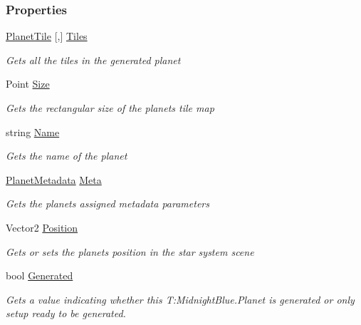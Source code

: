 \subsubsection*{Properties}
\begin{DoxyCompactItemize}
\item 
\hyperlink{class_midnight_blue_1_1_planet_tile}{Planet\+Tile} \mbox{[},\mbox{]} \hyperlink{class_midnight_blue_1_1_planet_a3e78bf28456cdfd2576b68e3ef106fc7}{Tiles}
\begin{DoxyCompactList}\small\item\em Gets all the tiles in the generated planet \end{DoxyCompactList}\item 
Point \hyperlink{class_midnight_blue_1_1_planet_a10c69ed4de9c28b2e61848e3bb89c377}{Size}
\begin{DoxyCompactList}\small\item\em Gets the rectangular size of the planets tile map \end{DoxyCompactList}\item 
string \hyperlink{class_midnight_blue_1_1_planet_aafbf18faf5aea56097d4f20d6b166d8a}{Name}
\begin{DoxyCompactList}\small\item\em Gets the name of the planet \end{DoxyCompactList}\item 
\hyperlink{class_midnight_blue_1_1_planet_metadata}{Planet\+Metadata} \hyperlink{class_midnight_blue_1_1_planet_a064b1e2b9aa83abac4065f4a7e0c5e58}{Meta}
\begin{DoxyCompactList}\small\item\em Gets the planets assigned metadata parameters \end{DoxyCompactList}\item 
Vector2 \hyperlink{class_midnight_blue_1_1_planet_a1ca1fc407e47136abb5b633e11cb8d51}{Position}
\begin{DoxyCompactList}\small\item\em Gets or sets the planets position in the star system scene \end{DoxyCompactList}\item 
bool \hyperlink{class_midnight_blue_1_1_planet_a525e5089a0a522069f10302d9ece26e1}{Generated}
\begin{DoxyCompactList}\small\item\em Gets a value indicating whether this T\+:\+Midnight\+Blue.\+Planet is generated or only setup ready to be generated. \end{DoxyCompactList}\end{DoxyCompactItemize}


